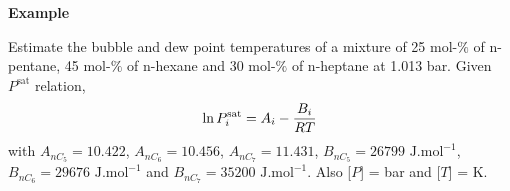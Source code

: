   \medskip
   \begin{MyExample}{\begin{center}{\bf Example}\end{center}}
     \begin{example}\label{Chapter:VLE:Example3}\citep{Sandler_Book}
       Estimate the bubble and dew point temperatures of a mixture of 25 mol-$\%$ of n-pentane, 45 mol-$\%$ of n-hexane and 30 mol-$\%$ of n-heptane at 1.013 bar. Given $P^{\text{sat}}$ relation,
    \begin{displaymath}
      \ln{P_{i}^{\text{sat}}} = A_{i} - \displaystyle\frac{B_{i}}{RT}
    \end{displaymath}
    with $A_{nC_{5}}=10.422$, $A_{nC_{6}}=10.456$, $A_{nC_{7}}=11.431$, $B_{nC_{5}}=26799 \text{ J.mol}^{-1}$, $B_{nC_{6}}=29676 \text{ J.mol}^{-1}$ and $B_{nC_{7}}=35200 \text{ J.mol}^{-1}$. Also [$P$] = bar and [$T$] = K.
     \end{example}


\end{MyExample}
